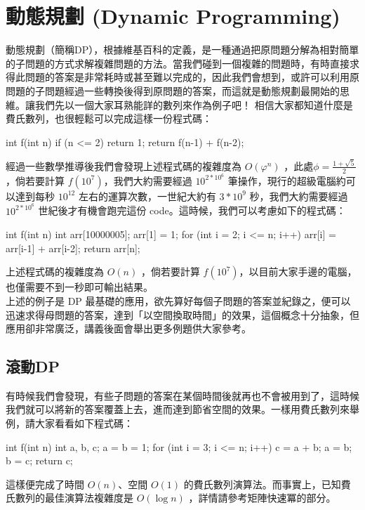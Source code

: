 \documentclass[main.tex]{subfiles}
\begin{document}
\section{動態規劃 (Dynamic Programming)}
動態規劃（簡稱DP），根據維基百科的定義，是一種通過把原問題分解為相對簡單的子問題的方式求解複雜問題的方法。當我們碰到一個複雜的問題時，有時直接求得此問題的答案是非常耗時或甚至難以完成的，因此我們會想到，或許可以利用原問題的子問題經過一些轉換後得到原問題的答案，而這就是動態規劃最開始的思維。讓我們先以一個大家耳熟能詳的數列來作為例子吧！
相信大家都知道什麼是費氏數列，也很輕鬆可以完成這樣一份程式碼：
\begin{C++}
	int f(int n) {
		if (n <= 2) return 1;
		return f(n-1) + f(n-2);
	}
\end{C++}
經過一些數學推導後我們會發現上述程式碼的複雜度為 $O(\varphi^n)$ ，此處$\phi = \frac{1 + \sqrt{5}}{2}$，倘若要計算 $f(10^7)$，我們大約需要經過 $10^{2 * 10^6}$ 筆操作，現行的超級電腦約可以達到每秒 $10^12$ 左右的運算次數，一世紀大約有 $3 * 10^9$ 秒，我們大約需要經過 $10^{2 * 10^6}$ 世紀後才有機會跑完這份 code。這時候，我們可以考慮如下的程式碼：
\begin{C++}
	int f(int n) {
		int arr[10000005];
		arr[1] = 1;
		for (int i = 2; i <= n; i++) {
			arr[i] = arr[i-1] + arr[i-2];
		}
		return arr[n];
	}
\end{C++}
上述程式碼的複雜度為 $O(n)$ ，倘若要計算 $f(10^7)$，以目前大家手邊的電腦，也僅需要不到一秒即可輸出結果。\\
上述的例子是 DP 最基礎的應用，欲先算好每個子問題的答案並紀錄之，便可以迅速求得母問題的答案，達到「以空間換取時間」的效果，這個概念十分抽象，但應用卻非常廣泛，講義後面會舉出更多例題供大家參考。

\subsection{滾動DP} 
有時候我們會發現，有些子問題的答案在某個時間後就再也不會被用到了，這時候我們就可以將新的答案覆蓋上去，進而達到節省空間的效果。一樣用費氏數列來舉例，請大家看看如下程式碼：
\begin{C++}
	int f(int n) {
		int a, b, c;
		a = b = 1;
		for (int i = 3; i <= n; i++) {
			c = a + b;
			a = b;
			b = c;
		}
		return c;
	}
\end{C++}
這樣便完成了時間 $O(n)$、空間 $O(1)$ 的費氏數列演算法。而事實上，已知費氏數列的最佳演算法複雜度是 $O(\log n)$ ，詳情請參考矩陣快速冪的部分。
\end{document}
